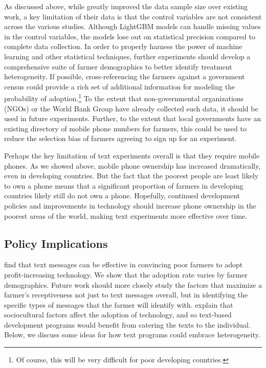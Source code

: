 \documentclass[12pt]{article}
\begin{document}
As discussed above, while \textcite{fabregas_digital_2025} greatly improved the data sample size over existing work, a key limitation of their data is that the control variables are not consistent across the various studies. Although LightGBM models can handle missing values in the control variables, the models lose out on statistical precision compared to complete data collection. In order to properly harness the power of machine learning and other statistical techniques, further experiments should develop a comprehensive suite of farmer demographics to better identify treatment heterogeneity. If possible, cross-referencing the farmers against a government census could provide a rich set of additional information for modeling the probability of adoption.\footnote{Of course, this will be very difficult for poor developing countries.} To the extent that non-governmental organizations (NGOs) or the World Bank Group have already collected such data, it should be used in future experiments. Further, to the extent that local governments have an existing directory of mobile phone numbers for farmers, this could be used to reduce the selection bias of farmers agreeing to sign up for an experiment.

Perhaps the key limitation of text experiments overall is that they require mobile phones. As we showed above, mobile phone ownership has increased dramatically, even in developing countries. But the fact that the poorest people are least likely to own a phone means that a significant proportion of farmers in developing countries likely still do not own a phone. Hopefully, continued development policies and improvements in technology should increase phone ownership in the poorest areas of the world, making text experiments more effective over time.

\subsection{Policy Implications}

\textcite{fabregas_digital_2025} find that text messages can be effective in convincing poor farmers to adopt profit-increasing technology. We show that the adoption rate varies by farmer demographics. Future work should more closely study the factors that maximize a farmer's receptiveness not just to text messages overall, but in identifying the specific types of messages that the farmer will identify with. \textcite{aker_promise_2016} explain that sociocultural factors affect the adoption of technology, and so text-based development programs would benefit from catering the texts to the individual. Below, we discuss some ideas for how text programs could embrace heterogeneity.
\end{document}
